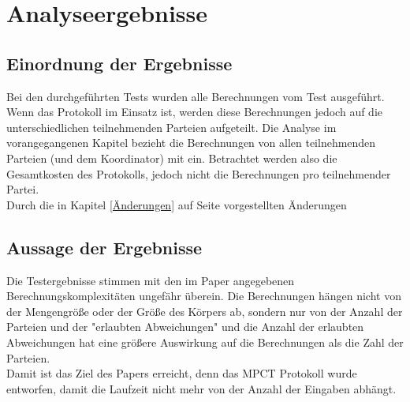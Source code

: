 \section{Analyseergebnisse}
\subsection{Einordnung der Ergebnisse}
Bei den durchgeführten Tests wurden alle Berechnungen vom Test ausgeführt. Wenn das Protokoll im Einsatz ist, werden diese Berechnungen jedoch auf die unterschiedlichen teilnehmenden Parteien aufgeteilt. Die Analyse im vorangegangenen Kapitel bezieht die Berechnungen von allen teilnehmenden Parteien (und dem Koordinator) mit ein. Betrachtet werden also die Gesamtkosten des Protokolls, jedoch nicht die Berechnungen pro teilnehmender Partei.\\
Durch die in Kapitel \ref{Änderungen} auf Seite \pageref{Änderungen} vorgestellten Änderungen 


\subsection{Aussage der Ergebnisse}
Die Testergebnisse stimmen mit den im Paper angegebenen Berechnungskomplexitäten ungefähr überein. Die Berechnungen hängen nicht von der Mengengröße oder der Größe des Körpers ab, sondern nur von der Anzahl der Parteien und der "erlaubten Abweichungen" und die Anzahl der erlaubten Abweichungen hat eine größere Auswirkung auf die Berechnungen als die Zahl der Parteien.\\
Damit ist das Ziel des Papers \cite{Doettling2021} erreicht, denn das MPCT Protokoll wurde entworfen, damit die Laufzeit nicht mehr von der Anzahl der Eingaben abhängt.